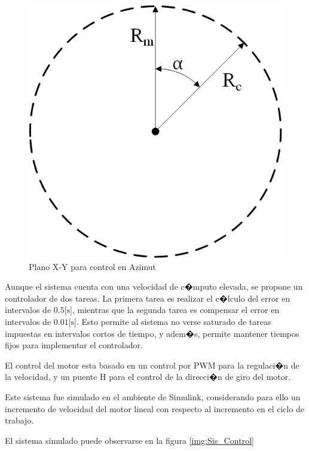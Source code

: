 \documentclass[10pt,a4paper]{book}
\begin{document}
\begin{figure}[H]
	\centering
		\includegraphics[scale=0.5]{Imagenes/SRD/PlanoAzimut.png}
	\caption{Plano X-Y para control en Azimut}
	\label{img:PlanoAzimut}
\end{figure}

Aunque el sistema cuenta con una velocidad de c�mputo elevada, se propone un controlador de dos tareas. La primera tarea es realizar el c�lculo del error en intervalos de $0.5\text{[s]}$, mientras que la segunda tarea es compensar el error en intervalos de $0.01\text{[s]}$. Esto permite al sistema no verse saturado de tareas impuestas en intervalos cortos de tiempo, y adem�s, permite mantener tiempos fijos para implementar el controlador.

El control del motor esta basado en un control por PWM para la regulaci�n de la velocidad, y un puente H para el control de la direcci�n de giro del motor.

Este sistema fue simulado en el ambiente de Simulink, considerando para ello un incremento de velocidad del motor lineal con respecto al incremento en el ciclo de trabajo.

El sistema simulado puede observarse en la figura \ref{img:Sis_Control}
\end{document}

